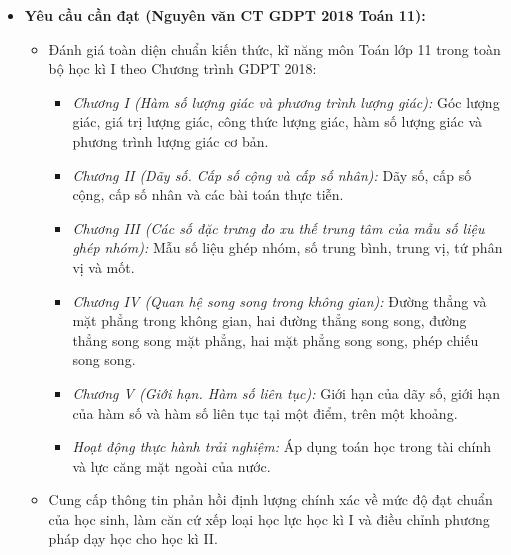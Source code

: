 \documentclass[12pt, a4paper]{article}
\begin{document}
\begin{itemize}[leftmargin=1.2cm]
    \item \textbf{Yêu cầu cần đạt (Nguyên văn CT GDPT 2018 Toán 11):}
    \begin{itemize}[leftmargin=0.6cm]
        \item Đánh giá toàn diện chuẩn kiến thức, kĩ năng môn Toán lớp 11 trong toàn bộ học kì I theo Chương trình GDPT 2018:
        \begin{itemize}
            \item \textit{Chương I (Hàm số lượng giác và phương trình lượng giác):} Góc lượng giác, giá trị lượng giác, công thức lượng giác, hàm số lượng giác và phương trình lượng giác cơ bản.
            \item \textit{Chương II (Dãy số. Cấp số cộng và cấp số nhân):} Dãy số, cấp số cộng, cấp số nhân và các bài toán thực tiễn.
            \item \textit{Chương III (Các số đặc trưng đo xu thế trung tâm của mẫu số liệu ghép nhóm):} Mẫu số liệu ghép nhóm, số trung bình, trung vị, tứ phân vị và mốt.
            \item \textit{Chương IV (Quan hệ song song trong không gian):} Đường thẳng và mặt phẳng trong không gian, hai đường thẳng song song, đường thẳng song song mặt phẳng, hai mặt phẳng song song, phép chiếu song song.
            \item \textit{Chương V (Giới hạn. Hàm số liên tục):} Giới hạn của dãy số, giới hạn của hàm số và hàm số liên tục tại một điểm, trên một khoảng.
            \item \textit{Hoạt động thực hành trải nghiệm:} Áp dụng toán học trong tài chính và lực căng mặt ngoài của nước.
        \end{itemize}
        \item Cung cấp thông tin phản hồi định lượng chính xác về mức độ đạt chuẩn của học sinh, làm căn cứ xếp loại học lực học kì I và điều chỉnh phương pháp dạy học cho học kì II.
    \end{itemize}


\end{itemize}
\end{document}

